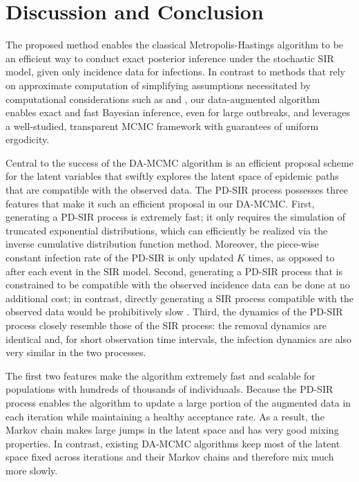 \documentclass[12pt]{article}
\begin{document}
\section{Discussion and Conclusion}
\label{sec:dis}
The proposed method enables the classical Metropolis-Hastings algorithm to be an efficient way to conduct exact posterior inference under the stochastic SIR model, given only incidence data for infections. %
In contrast to methods that rely on approximate computation of simplifying assumptions necessitated by computational considerations such as \cite{McKinley.2018} and \cite{Fintzi.2020}, 
our data-augmented algorithm enables exact and fast Bayesian inference, even for large outbreaks, and leverages a well-studied, transparent MCMC framework with  guarantees of uniform ergodicity.

Central to the success of the DA-MCMC algorithm is an efficient proposal scheme for the latent variables that swiftly explores the latent space of epidemic paths that are compatible with the observed data. The PD-SIR process possesses three features that make it such an efficient proposal in our DA-MCMC. First, generating a PD-SIR process is extremely fast; it only requires the simulation of truncated exponential distributions, which can efficiently be realized via the inverse cumulative distribution function method. Moreover, the piece-wise constant infection rate of the PD-SIR is only updated $K$ times, as opposed to after each event in the SIR model. Second, generating a PD-SIR process that is constrained to be compatible with the observed incidence data can be done at no additional cost; in contrast, directly generating a SIR process compatible with the observed data would be prohibitively slow \citep{Hobolth.2009}. Third, the dynamics of the PD-SIR process closely resemble those of the SIR process: the removal dynamics are identical and, for short observation time intervals, the infection dynamics are also very similar in the two processes.

The first two features make the algorithm extremely fast and scalable for populations with hundreds of thousands of individuaals. %
Because the PD-SIR process enables the algorithm to update a large portion of the augmented data in each iteration while maintaining a healthy acceptance rate. As a result, the Markov chain makes large jumps in the latent space and has very good mixing properties. In contrast, existing DA-MCMC algorithms \citep{Gibson.1998, ONeill.1999, Fintzi.2017} keep most of the latent space fixed across iterations  and their Markov chains and therefore mix much more slowly.
\end{document}
